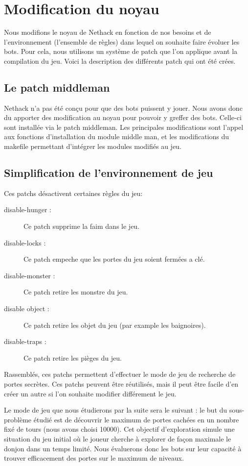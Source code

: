 \chapter{Modification du noyau}

Nous modifions le noyau de Nethack en fonction de nos besoins et de l'environnement (l'ensemble de règles) dans lequel on souhaite faire évoluer les bots. Pour cela, nous utilisons un système de patch que l'on applique avant la compilation du jeu. Voici la description des différents patch qui ont été crées.

\section{Le patch middleman}

Nethack n'a pas été conçu pour que des bots puissent y jouer. Nous avons donc du apporter des modification au noyau pour pouvoir y greffer des bots. Celle-ci sont installée via le patch middleman. Les principales modifications sont l'appel aux fonctions d'installation du module middle man, et les modifications du makefile permettant d'intégrer les modules modifiés au jeu.   

\section{Simplification de l'environnement de jeu}

Ces patchs désactivent certaines règles du jeu:
\begin{description}
\item[disable-hunger :] Ce patch supprime la faim dans le jeu.
\item[disable-locks :] Ce patch empeche que les portes du jeu soient fermées a clé.
\item[disable-monster :] Ce patch retire les monstre du jeu.
\item[disable object :] Ce patch retire les objet du jeu (par example les baignoires).
\item[disable-traps :] Ce patch retire les pièges du jeu.
\end{description}

Rassemblés, ces patchs permettent d'effectuer le mode de jeu de recherche de portes secrètes. Ces patchs peuvent être réutilisés, mais il peut être facile d'en créer un autre si l'on souhaite modifier différement le jeu.

Le mode de jeu que nous étudierons par la suite sera le suivant : le but du sous-problème étudié est de découvrir le maximum de portes cachées en un nombre fixé de tours (nous avons choisi 10000). Cet objectif d'exploration simule une situation du jeu initial où le joueur cherche à explorer de façon maximale le donjon dans un temps limité. Nous évaluerons donc les bots sur leur capacité à trouver efficacement des portes sur le maximum de niveaux.

